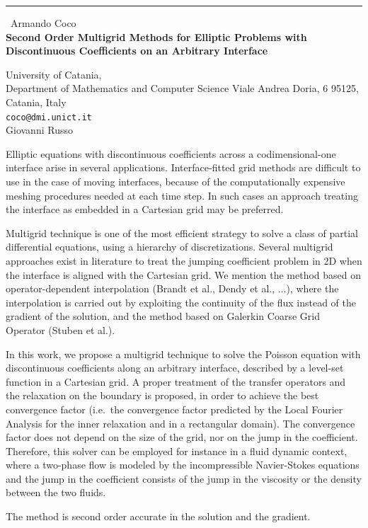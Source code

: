 \documentclass{report}
\begin{document}
\begin{center}
\rule{6in}{1pt} \
{\large Armando Coco \\
{\bf Second Order Multigrid Methods for Elliptic Problems with Discontinuous Coefficients on an Arbitrary Interface}}

University of Catania,\\
Department of Mathematics and Computer Science Viale Andrea Doria, 6 95125,\\
Catania, Italy
\\
{\tt coco@dmi.unict.it}\\
Giovanni Russo\end{center}

Elliptic equations with discontinuous coefficients across a
codimensional-one interface arise in several applications.
Interface-fitted grid methods are difficult to use in the case of moving
interfaces, because of the computationally expensive meshing procedures
needed at each time step. In such cases an approach treating the
interface as embedded in a Cartesian grid may be preferred.

Multigrid technique is one of the most efficient strategy to solve a
class of partial differential equations, using a hierarchy of
discretizations.
Several multigrid approaches exist in literature to treat the jumping
coefficient problem in 2D when the interface is aligned with the
Cartesian grid. We mention the method based on operator-dependent
interpolation (Brandt et al., Dendy et al., ...), where the interpolation
is carried out by exploiting the continuity of the flux instead of the
gradient of the solution, and the method based on Galerkin Coarse Grid
Operator (Stuben et al.).

In this work, we propose a multigrid technique to solve the Poisson
equation with discontinuous coefficients along an arbitrary interface,
described by a level-set function in a Cartesian grid.
A proper treatment of the transfer operators and the relaxation on the
boundary is proposed, in order to achieve the best convergence factor
(i.e.\ the convergence factor predicted by the Local Fourier Analysis for
the inner relaxation and in a rectangular domain). The convergence factor
does not depend on the size of the grid, nor on the jump in the
coefficient. Therefore, this solver can be employed for instance in a
fluid dynamic context, where a two-phase flow is modeled by the
incompressible Navier-Stokes equations and the jump in the coefficient
consists of the jump in the viscosity or the density between the two
fluids.

The method is second order accurate in the solution and the gradient.
\end{document}
